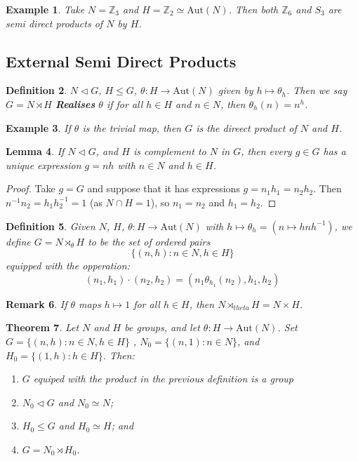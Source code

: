\documentclass[a4paper,10pt]{article}
\newcommand{\ZZ}{\mathbb{Z}}
\newtheorem{thm}{Theorem}
\newtheorem{Def}[thm]{Definition}
\newtheorem{eg}[thm]{Example}
\newtheorem{Lem}[thm]{Lemma}
\newtheorem{rem}[thm]{Remark}
\begin{document}
\begin{eg}
Take $N = \ZZ_3$ and $H = \ZZ_2 \simeq \text{Aut}(N)$. Then both $\ZZ_6$ and $S_3$ are semi direct products of $N$ by $H$. 
\end{eg}


\subsection{External Semi Direct Products}

\begin{Def}
$N \triangleleft G $, $H \leq G$, $\theta : H \rightarrow \text{Aut}(N)$ given by $h \mapsto \theta_h$. Then we say $G = N \rtimes H$ \textbf{Realises} $\theta$ if for all $h \in H$ and $n \in N$, then $\theta_h (n) = n^h$. 
\end{Def}

\begin{eg}
If $\theta$ is the trivial map, then $G$ is the direect product of $N$ and $H$. 
\end{eg}

\begin{Lem}
If $N \triangleleft G$, and $H$ is complement to $N$ in $G$, then every $g \in G$ has a unique expression $g = nh$ with $n \in N$ and $h \in H$.
\end{Lem}

\begin{proof}
Take $g = G$ and suppose that it has expressions $g = n_1 h_1 = n_2 h_2$. Then $n^{-1} n_2 = h_1 h_2^{-1} = 1$ (as $N \cap H = 1$), so $n_1 = n_2$ and $h_1 = h_2$. 
\end{proof}


\begin{Def}
Given $N$, $H$, $\theta: H \rightarrow \text{Aut}(N)$ with $h \mapsto \theta_h = (n \mapsto h n h^{-1})$, we define $G = N \rtimes_{\theta} H$ to be the set of ordered pairs
\[ \{ (n,h) : n \in N, h \in H \} \]
equipped with the opperation:
\[ (n_1, h_1) \cdot (n_2, h_2) = ( n_1 \theta_{h_1} (n_2), h_1, h_2 ) \]
\end{Def}

\begin{rem}
If $\theta$ maps $h \mapsto 1$ for all $h \in H$, then $N \rtimes_{theta} H = N \times H$. 
\end{rem}

\begin{thm}
Let $N$ and $H$ be groups, and let $\theta : H \rightarrow \text{Aut}(N)$. Set $G = \{ (n,h) : n \in N, h \in H \}$ , $N_0 = \{ (n,1) : n \in N \}$, and $H_0 = \{ (1, h) : h \in H \}$. Then:
\begin{enumerate}
\item $G$ equiped with the product in the previous definition is a group
\item $N_0 \triangleleft G$ and $N_0 \simeq N$; 
\item $H_0 \leq G$ and $H_0 \simeq H$; and
\item $G = N_0 \rtimes H_0$. 
\end{enumerate}

\end{thm}
\end{document}
